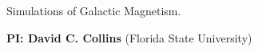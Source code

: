
\begin{center} 
\begin{LARGE}
Simulations of Galactic Magnetism.
\end{LARGE}
\end{center}

\pagestyle{plain}
\begin{center}
\textbf{PI: David C. Collins} (Florida State University)
\end{center}

